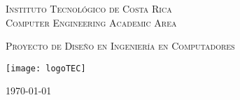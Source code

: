 
\thispagestyle{empty} 

\begin{center}

\textsc{\LARGE Instituto Tecnol\'ogico de Costa Rica} \\
\textsc{\Large Computer Engineering Academic Area}

\textsc{\Large Proyecto de Dise\~no en Ingenier\'ia en Computadores}


\par\vspace{20mm}

\texttt{[image: logoTEC]}

\par\vspace*{\fill}

{\LARGE\bf{\textsf{ \Huge \scriptTitle}}}

\par\vspace*{\fill}



\textsc{\Large \scriptAuthor}

\vspace*{\fill}

{\today}

\end{center}
\newpage 
\cleardoublepage  
